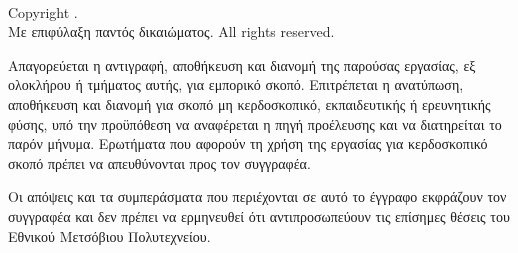 \thispagestyle{empty}
\vspace*{\fill}
\noindent\dotfill\\
\authorname
\vspace{2cm}

\noindent Copyright \textcopyright{} \authorname.\\
Με επιφύλαξη παντός δικαιώματος. All rights reserved.
\vspace{0.5cm}

\noindent Απαγορεύεται η αντιγραφή, αποθήκευση και διανομή της παρούσας εργασίας, εξ
ολοκλήρου ή τμήματος αυτής, για εμπορικό σκοπό. Επιτρέπεται η ανατύπωση, αποθήκευση και
διανομή για σκοπό μη κερδοσκοπικό, εκπαιδευτικής ή ερευνητικής φύσης, υπό την προϋπόθεση να
αναφέρεται η πηγή προέλευσης και να διατηρείται το παρόν μήνυμα. Ερωτήματα που αφορούν τη
χρήση της εργασίας για κερδοσκοπικό σκοπό πρέπει να απευθύνονται προς τον συγγραφέα.

\noindent Οι απόψεις και τα συμπεράσματα που περιέχονται σε αυτό το έγγραφο εκφράζουν τον
συγγραφέα και δεν πρέπει να ερμηνευθεί ότι αντιπροσωπεύουν τις επίσημες θέσεις του Εθνικού
Μετσόβιου Πολυτεχνείου.
\clearpage
